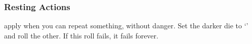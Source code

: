 \subsubsection{Resting Actions}
apply when you can repeat something, without danger.
Set the darker die to `' and roll the other.
If this roll fails, it fails forever.
